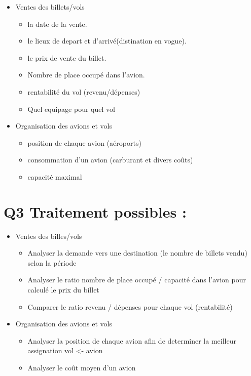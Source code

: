 \documentclass[oneside,13pt,a4paper]{article}
\begin{document}
\begin{itemize}
  \item Ventes des billets/vols
        \begin{itemize}
          \item la date de la vente.
          \item le lieux de depart et d'arrivé(distination en vogue).
          \item le prix de vente du billet.
          \item Nombre de place occupé dans l'avion.
          \item rentabilité du vol (revenu/dépenses)
          \item Quel equipage pour quel vol
        \end{itemize}
\end{itemize}
\begin{itemize}
  \item Organisation des avions et vols
        \begin{itemize}
          \item position de chaque avion (aéroports)
          \item consommation d'un avion (carburant et divers coûts)
          \item capacité maximal
        \end{itemize}
\end{itemize}

\section{Q3 Traitement possibles : }

\begin{itemize}
  \item Ventes des billes/vols
        \begin{itemize}
          \item Analyser la demande vers une destination (le nombre de billets vendu) selon la période
          \item Analyser le ratio nombre de place occupé / capacité dans l'avion pour calculé le prix du billet
          \item Comparer le ratio revenu / dépenses pour chaque vol (rentabilité)
        \end{itemize}
\end{itemize}
\begin{itemize}
  \item Organisation des avions et vols
        \begin{itemize}
          \item Analyser la position de chaque avion afin de determiner la meilleur assignation vol <- avion
          \item Analyser le coût moyen d'un avion
        \end{itemize}
\end{itemize}
\end{document}
